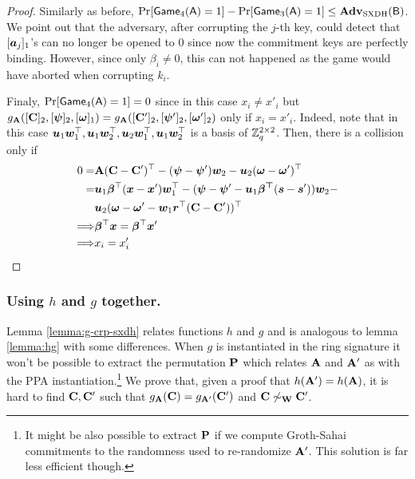 \begin{proof}
Similarly as before, $\Pr[\mathsf{Game}_4(\mathsf{A})=1]-\Pr[\mathsf{Game}_3(\mathsf{A})=1]\leq\mathbf{Adv}_\mathrm{SXDH}(\mathsf{B})$. We point out that the adversary, after corrupting the $j$-th key, could detect that $[{\boldsymbol{a}}_j]_1$'s  can no longer be opened to 0 since now the commitment keys are perfectly binding. However, since only $\beta_i\neq 0$, this can not happened as the game would have aborted when corrupting $k_i$.

Finaly, $\Pr[\mathsf{Game}_4(\mathsf{A})=1]=0$ since in this case $x_i \neq x'_i$ but $g_{\mathbf{{A}}}([\mathbf{{C}}]_2,[{\boldsymbol{\psi}}]_2,\allowbreak[{\boldsymbol{\omega}}]_1)=g_{\mathbf{{A}}}([\mathbf{{C}}']_2,[{\boldsymbol{\psi}}']_2,[{\boldsymbol{\omega}}']_2)$  only if $x_i = x'_i$. Indeed, note that in this case ${\boldsymbol{u}}_1{\boldsymbol{w}}_1^\top,{\boldsymbol{u}}_1{\boldsymbol{w}}_2^\top,\allowbreak{\boldsymbol{u}}_2{\boldsymbol{w}}_1^\top,{\boldsymbol{u}}_1{\boldsymbol{w}}_2^\top$ is a basis of $\mathbb{Z}_q^{2\times 2}$. Then, there is a collision only if
\begin{align*}
0=&\matr{A}(\matr{C}-\matr{C}')^\top - (\vec{\psi}-\vecb{\psi}')\vecb{w}_2 - \vecb{u}_2(\vecb{\omega}-\vecb{\omega}')^\top\\
=&\vecb{u}_1\vecb{\beta}^\top(\vecb{x}-\vecb{x}')\vecb{w}_1^\top - (\vec{\psi}-\vecb{\psi}'-\vecb{u}_1\vecb{\beta^\top}(\vecb{s}-\vecb{s}'))\vecb{w}_2 - \\
&\vecb{u}_2(\vecb{\omega}-\vecb{\omega}'-\vecb{w}_1\vecb{r}^\top(\matr{C}-\matr{C}'))^\top\\
\Longrightarrow & \vecb{\beta}^\top\vecb{x}=\vecb{\beta}^\top\vecb{x}' \\
\Longrightarrow  &x_i  = x'_i\\
\end{align*}
\end{proof}

\subsubsection{Using $h$ and $g$ together.}
Lemma \ref{lemma:g-crp-sxdh} relates functions $h$ and $g$ and is analogous to lemma \ref{lemma:hg} with some differences. When $g$ is instantiated in the ring signature it won't be possible to extract the permutation $\mathbf{{P}}$ which relates $\mathbf{{A}}$ and $\mathbf{{A}}'$ as with the PPA instantiation.\footnote{It might be also possible to extract $\mathbf{{P}}$ if we compute Groth-Sahai commitments to the randomness used to re-randomize $\mathbf{{A}}'$. This solution is far less efficient though.}
We prove that, given a proof that $h(\mathbf{{A}}')=h(\mathbf{{A}})$, it is hard to find $\mathbf{{C}},\mathbf{{C}}'$ such that $g_{\mathbf{{A}}}(\mathbf{{C}})=g_{\mathbf{{A'}}}(\mathbf{{C}}')$ and $\mathbf{{C}}\not\sim_{\mathbf{{W}}}\mathbf{{C}}'$.

